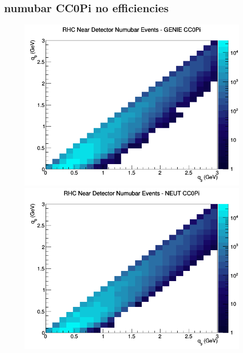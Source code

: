 \subsection{numubar CC0Pi no efficiencies}
\begin{figure}[h]
\includegraphics[width=\linewidth]{q0_q3/nominal/CC0Pi_RHC_ND_numubar_q3_q0_GENIE.png}
\endminipage
{}
\includegraphics[width=\linewidth]{q0_q3/nominal/CC0Pi_RHC_ND_numubar_q3_q0_NEUT.png}
\endminipage
{}

\end{figure}
